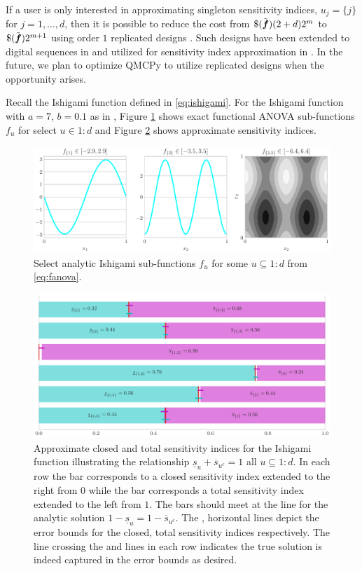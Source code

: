\documentclass{article}[12pt]
\begin{document}
If a user is only interested in approximating singleton sensitivity indices, $u_j = \{j\}$ for $j=1,\dots,d$, then it is possible to reduce the cost from $\$(\tilde{\bf})(2+d)2^m$ to $\$(\tilde{\bf})2^{m+1}$ using order $1$ replicated designs \cite{alex2008comparison,tissot2015randomized}. Such designs have been extended to  digital sequences in \cite{replicated_designs_sobol_seq} and utilized for sensitivity index approximation in \cite{reliable_sobol_indices_approx}. In the future, we plan to optimize QMCPy to utilize replicated designs when the opportunity arises.

Recall the Ishigami function defined in \eqref{eq:ishigami}. For the Ishigami function with $a=7$, $b=0.1$ as in \cite{crestaux2007polynomial,marrel2009calculations}, Figure \ref{fig:ishigami_fu} shows exact functional ANOVA sub-functions $f_u$ for select $u \in 1:d$ and Figure \ref{fig:ishigami} shows approximate sensitivity indices. 

\begin{figure}[H]
    \centering
    \includegraphics[width=.8\textwidth]{figs/ishigami_fu.pdf}
    \caption{Select analytic Ishigami sub-functions $f_u$ for some $u \subseteq 1:d$ from \eqref{eq:fanova}.}
    \label{fig:ishigami_fu}
\end{figure}

\begin{figure}[H]
    \centering
    \includegraphics[width=.8\textwidth]{figs/ishigami.pdf}
    \caption{Approximate closed and total sensitivity indices for the Ishigami function illustrating the relationship $\underline{s}_u + \overline{s}_{u^c} = 1$ all $u \subseteq 1:d$. In each row the  bar corresponds to a closed sensitivity index extended to the right from $0$ while the  bar corresponds a total sensitivity index extended to the left from $1$. The bars should meet at the  line for the  analytic solution $1-\underline{s}_u=1-\overline{s}_{u^c}$. The ,  horizontal lines depict the error bounds for the closed, total sensitivity indices respectively. The  line crossing the  and  lines in each row indicates the true solution is indeed captured in the error bounds as desired.}
    \label{fig:ishigami}
\end{figure}
\end{document}
